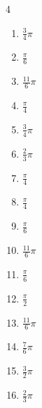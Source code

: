\begin{multicols}{4}
\begin{enumerate}
  \item $\displaystyle \frac{3}{4}\pi$

  \item $\displaystyle \frac{\pi}{6}$

  \item $\displaystyle \frac{11}{6}\pi$

  \item $\displaystyle \frac{\pi}{4}$

  \item $\displaystyle \frac{3}{4}\pi$

  \item $\displaystyle \frac{2}{3}\pi$

  \item $\displaystyle \frac{\pi}{4}$

  \item $\displaystyle \frac{\pi}{4}$

  \item $\displaystyle \frac{\pi}{6}$

  \item $\displaystyle \frac{11}{6}\pi$

  \item $\displaystyle \frac{\pi}{6}$

  \item $\displaystyle \frac{\pi}{2}$

  \item $\displaystyle \frac{11}{6}\pi$

  \item $\displaystyle \frac{7}{6}\pi$

\columnbreak %

  \item $\displaystyle \frac{3}{2}\pi$

  \item $\displaystyle \frac{2}{3}\pi$


\end{enumerate}
\end{multicols}

